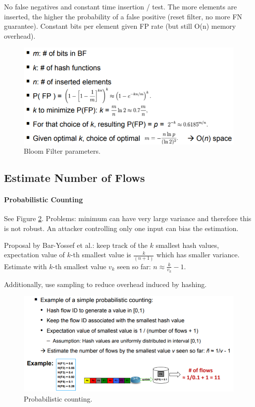 No false negatives and constant time insertion / test. The more elements are inserted, the higher the probability of a false positive (reset filter, no more FN guarantee). Constant bits per element given FP rate (but still O(n) memory overhead).


\begin{figure}[h]
	\centering
	\includegraphics[scale=0.6]{images/917-bloom.PNG}
	\caption{Bloom Filter parameters.}
	\label{fig:bloom}
\end{figure}

\subsection{Estimate Number of Flows}

\paragraph{Probabilistic Counting}
See Figure \ref{fig:counting}. Problems: minimum can have very large variance and therefore this is not robust. An attacker controlling only one input can bias the estimation.

Proposal by Bar-Yossef et al.: keep track of the $k$ smallest hash values, expectation value of $k$-th smallest value is $\frac{k}{(n+1)}$ which has smaller variance. Estimate with $k$-th smallest value $v_k$ seen so far: $n \approx \frac{k}{v_k} - 1$.

Additionally, use sampling to reduce overhead induced by hashing.

\begin{figure}[h]
	\centering
	\includegraphics[scale=0.6]{images/917-counting.PNG}
	\caption{Probabilistic counting.}
	\label{fig:counting}
\end{figure}

